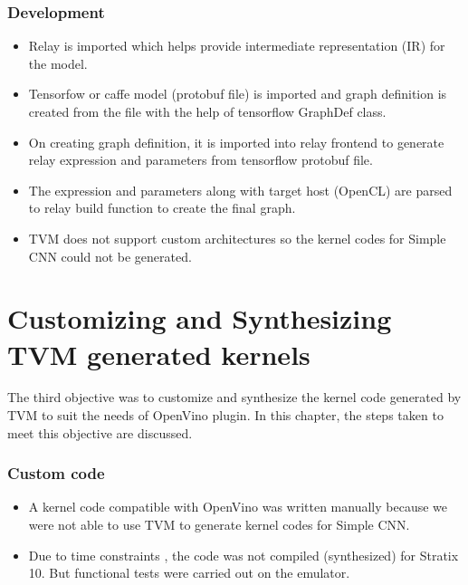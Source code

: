 \documentclass[titlepage]{report}
\begin{document}
\subsection{Development}
\begin{itemize}
    \item Relay is imported which helps provide intermediate representation (IR) for the model.
    \item Tensorfow or caffe model (protobuf file) is imported and graph definition is created from the file with the help of tensorflow GraphDef class.
    \item On creating graph definition, it is imported into relay frontend to generate relay expression and parameters from tensorflow protobuf file. 
    \item The expression and parameters along with target host (OpenCL) are parsed to relay build function to create the final graph. 
    \item TVM does not support custom architectures so the kernel codes for Simple CNN could not be generated.
\end{itemize}




\chapter{ Customizing and Synthesizing TVM generated kernels}  
The third objective was to customize and synthesize the kernel code generated by TVM to suit the needs of OpenVino plugin. In this chapter, the steps taken to meet this objective are discussed.
\subsection{Custom code}
\begin{itemize}
    \item  A kernel code compatible with OpenVino was written manually because we were not able to use TVM to generate kernel codes for Simple CNN.
    \item Due to time constraints , the code was not compiled (synthesized) for Stratix 10. But functional tests were carried out on the emulator.
    
\end{itemize}
\end{document}
